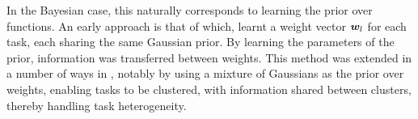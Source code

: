 In the Bayesian case, this naturally corresponds to learning the prior over functions. An early approach is that of \cite{Allenby1999} which, learnt a weight vector $\bm w_l$ for each task, each sharing the same Gaussian prior. By learning the parameters of the prior, information was transferred between weights. This method was extended in a number of ways in \cite{BakkerHeskes2003}, notably by using a mixture of Gaussians as the prior over weights, enabling tasks to be clustered, with information shared between clusters, thereby handling task heterogeneity.


%


